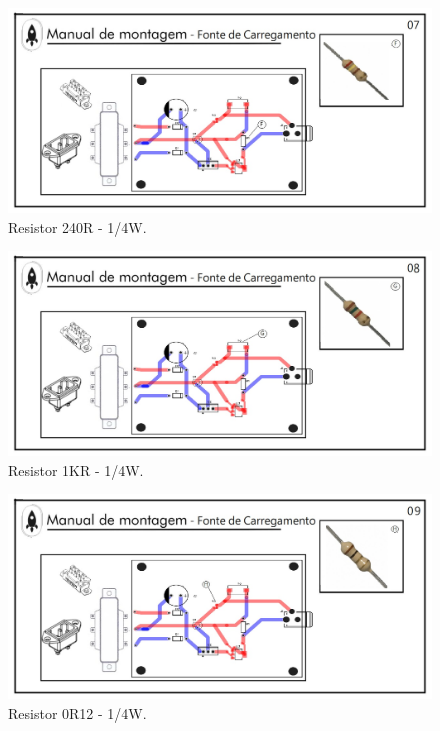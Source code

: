 \begin{figure}[H]
  \centering
  \includegraphics[width=\textwidth]{Figuras/Carregador/carregador_manual_07.jpg}
  \caption{Resistor 240R - 1/4W.} 
  \label{carregador07}
\end{figure}

\begin{figure}[H]
  \centering
  \includegraphics[width=\textwidth]{Figuras/Carregador/carregador_manual_08.jpg}
  \caption{ Resistor 1KR - 1/4W.} 
  \label{carregador08}
\end{figure}

\begin{figure}[H]
  \centering
  \includegraphics[width=\textwidth]{Figuras/Carregador/carregador_manual_09.jpg}
  \caption{Resistor 0R12 - 1/4W.} 
  \label{carregador09}
\end{figure}

